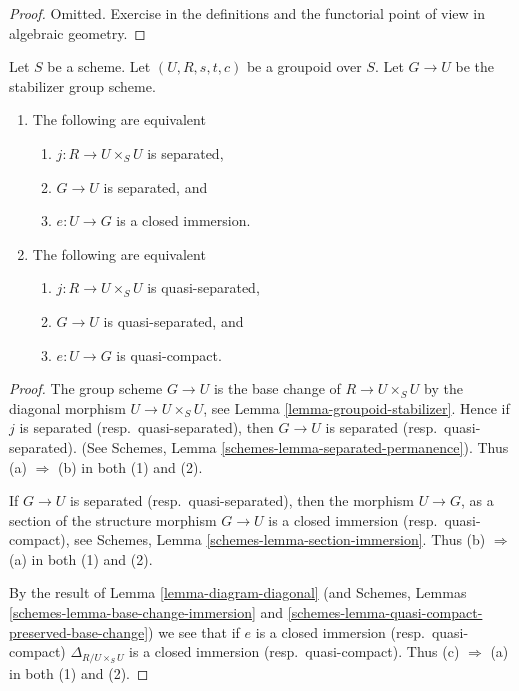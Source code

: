 \begin{proof}
Omitted.
Exercise in the definitions and the functorial point of
view in algebraic geometry.
\end{proof}

\begin{lemma}
\label{lemma-diagonal}
Let $S$ be a scheme.
Let $(U, R, s, t, c)$ be a groupoid over $S$.
Let $G \to U$ be the stabilizer group scheme.
\begin{enumerate}
\item The following are equivalent
\begin{enumerate}
\item $j : R \to U \times_S U$ is separated,
\item $G \to U$ is separated, and
\item $e : U \to G$ is a closed immersion.
\end{enumerate}
\item The following are equivalent
\begin{enumerate}
\item $j : R \to U \times_S U$ is quasi-separated,
\item $G \to U$ is quasi-separated, and
\item $e : U \to G$ is quasi-compact.
\end{enumerate}
\end{enumerate}
\end{lemma}

\begin{proof}
The group scheme $G \to U$ is the base change of $R \to U \times_S U$
by the diagonal morphism $U \to U \times_S U$, see
Lemma \ref{lemma-groupoid-stabilizer}. Hence if
$j$ is separated (resp.\ quasi-separated),
then $G \to U$ is separated (resp.\ quasi-separated).
(See Schemes, Lemma
\ref{schemes-lemma-separated-permanence}).
Thus (a) $\Rightarrow$ (b) in both (1) and (2).

\medskip\noindent
If $G \to U$ is separated (resp.\ quasi-separated), then the morphism
$U \to G$, as a section of the structure morphism $G \to U$ is a closed
immersion (resp.\ quasi-compact), see
Schemes, Lemma \ref{schemes-lemma-section-immersion}.
Thus (b) $\Rightarrow$ (a) in both (1) and (2).

\medskip\noindent
By the result of
Lemma \ref{lemma-diagram-diagonal}
(and Schemes, Lemmas \ref{schemes-lemma-base-change-immersion}
and \ref{schemes-lemma-quasi-compact-preserved-base-change})
we see that if $e$ is a closed immersion (resp.\ quasi-compact)
$\Delta_{R/U \times_S U}$ is a closed
immersion (resp.\ quasi-compact).
Thus (c) $\Rightarrow$ (a) in both (1) and (2).
\end{proof}









